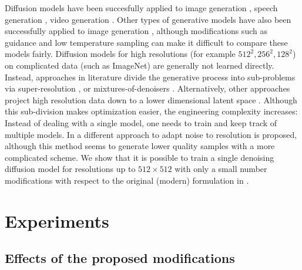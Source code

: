 Diffusion models have been succesfully applied to image generation \citep{ho2020denoising,ho2022cascaded}, speech generation \citep{chen2020wavegrad,kong2021diffwave}, video generation \citep{singer2022makeavideo,saharia2022imagen}. Other types of generative models have also been successfully applied to image generation \citep{chang2022maskgit,sauer2022styleganxl,anonymous2023discrete}, although modifications such as guidance and low temperature sampling can make it difficult to compare these models fairly.
Diffusion models for high resolutions (for example $512^2, 256^2, 128^2$) on complicated data (such as ImageNet) are generally not learned directly. Instead, approaches in literature divide the generative process into sub-problems via super-resolution \citep{ho2022cascaded}, or mixtures-of-denoisers \citep{feng2022ernievilg,balaji2022ediffi}. Alternatively, other approaches project high resolution data down to a lower dimensional latent space \citep{rombach2022highresolution}. Although this sub-division makes optimization easier, the engineering complexity increases: Instead of dealing with a single model, one needs to train and keep track of multiple models. In \citep{gu2022fdm} a different approach to adapt noise to resolution is proposed, although this method seems to generate lower quality samples with a more complicated scheme. We show that it is possible to train a single denoising diffusion model for resolutions up to $512 \times 512$ with only a small number modifications with respect to the original (modern) formulation in \citep{ho2020denoising}.

\section{Experiments}
\label{sec:results}

\subsection{Effects of the proposed modifications}

